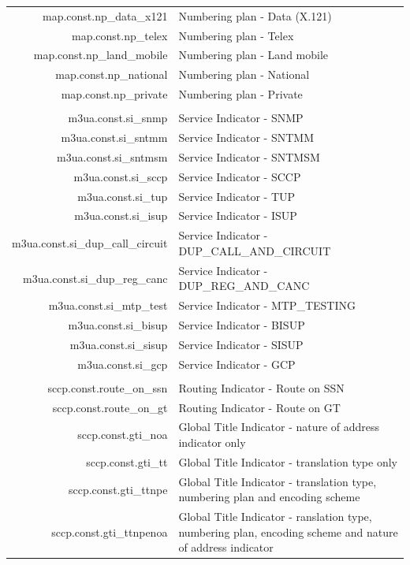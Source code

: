\documentclass[a4paper,latin]{paper}
\begin{document}
\begin{tabularx}{\linewidth}{ | >{\ttfamily} r | >{\ttfamily} X |}
	map.const.np\_data\_x121			& Numbering plan - Data (X.121)\\
	map.const.np\_telex				& Numbering plan - Telex\\
	map.const.np\_land\_mobile			& Numbering plan - Land mobile\\
	map.const.np\_national				& Numbering plan - National\\
	map.const.np\_private				& Numbering plan - Private\\
	\hline
	\rowcolor{blue!10}
	\multicolumn{2}{| l |}{\acrfull{m3ua}} 		\\
	\hline
	m3ua.const.si\_snmp				& Service Indicator - SNMP\\
	m3ua.const.si\_sntmm				& Service Indicator - SNTMM\\
	m3ua.const.si\_sntmsm				& Service Indicator - SNTMSM\\
	m3ua.const.si\_sccp				& Service Indicator - SCCP\\
	m3ua.const.si\_tup				& Service Indicator - TUP\\
	m3ua.const.si\_isup				& Service Indicator - ISUP\\
	m3ua.const.si\_dup\_call\_circuit		& Service Indicator - DUP\_CALL\_AND\_CIRCUIT\\
	m3ua.const.si\_dup\_reg\_canc			& Service Indicator - DUP\_REG\_AND\_CANC\\
	m3ua.const.si\_mtp\_test			& Service Indicator - MTP\_TESTING\\
	m3ua.const.si\_bisup				& Service Indicator - BISUP\\
	m3ua.const.si\_sisup				& Service Indicator - SISUP\\
	m3ua.const.si\_gcp				& Service Indicator - GCP\\
	\hline
	\rowcolor{blue!10}
	\multicolumn{2}{| l |}{\acrfull{sccp}} 		\\
	\hline
	sccp.const.route\_on\_ssn			& Routing Indicator - Route on SSN\\
	sccp.const.route\_on\_gt			& Routing Indicator - Route on GT\\
	sccp.const.gti\_noa				& Global Title Indicator - nature of address indicator only\\
	sccp.const.gti\_tt				& Global Title Indicator - translation type only\\
	sccp.const.gti\_ttnpe				& Global Title Indicator - translation type, numbering plan and encoding scheme\\
	sccp.const.gti\_ttnpenoa			& Global Title Indicator - ranslation type, numbering plan, encoding scheme and nature of address indicator\\

\end{tabularx}
\end{document}
